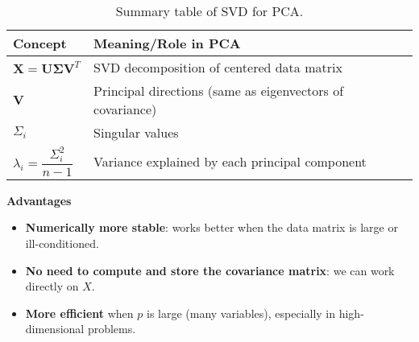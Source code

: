 \begin{table}[!htp]
    \centering
        \begin{tabular}{@{} l | l @{}}
            \toprule
            \textbf{Concept} & \textbf{Meaning/Role in PCA} \\
            \midrule
            $ \mathbf{X} = \mathbf{U} \boldsymbol{\Sigma} \mathbf{V}^{T} $  & SVD decomposition of centered data matrix                 \\ [.5em]
            $ \mathbf{V} $                                                  & Principal directions (same as eigenvectors of covariance) \\ [.5em]
            $ \Sigma_{i} $                                                  & Singular values                                           \\ [.5em]
            $ \lambda_{i} = \dfrac{\Sigma_{i}^{2}}{n-1} $                   & Variance explained by each principal component            \\
            \bottomrule
        \end{tabular}
    \caption{Summary table of SVD for PCA.}
\end{table}

\highspace
\begin{flushleft}
    \textcolor{Green3}{ \textbf{Advantages}}
\end{flushleft}
\begin{itemize}[label=\textcolor{Green3}{}]
    \item \textcolor{Green3}{\textbf{Numerically more stable}}: works better when the data matrix is large or ill-conditioned.
    \item \textcolor{Green3}{\textbf{No need to compute and store the covariance matrix}}: we can work directly on $X$.
    \item \textcolor{Green3}{\textbf{More efficient}} when $p$ is large (many variables), especially in high-dimensional problems.
\end{itemize}